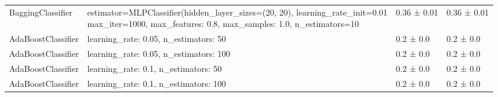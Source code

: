 \begin{tabular}{llll}
    \addlinespace[15pt]
    BaggingClassifier          & \makecell[l]{estimator=MLPClassifier(hidden\_layer\_sizes=(20, 20),                                        learning\_rate\_init=0.01                                        \\max\_iter=1000, max\_features: 0.8, max\_samples: 1.0, n\_estimators=10}                                                                    & 0.36 ± 0.01    & 0.36 ± 0.01         \\
    \addlinespace[15pt]
    AdaBoostClassifier         & learning\_rate: 0.05, n\_estimators: 50                                                                                              & 0.2 ± 0.0      & 0.2 ± 0.0           \\
    AdaBoostClassifier         & learning\_rate: 0.05, n\_estimators: 100                                                                                             & 0.2 ± 0.0      & 0.2 ± 0.0           \\
    AdaBoostClassifier         & learning\_rate: 0.1, n\_estimators: 50                                                                                               & 0.2 ± 0.0      & 0.2 ± 0.0           \\
    AdaBoostClassifier         & learning\_rate: 0.1, n\_estimators: 100                                                                                              & 0.2 ± 0.0      & 0.2 ± 0.0           \\
    \bottomrule
\end{tabular}
